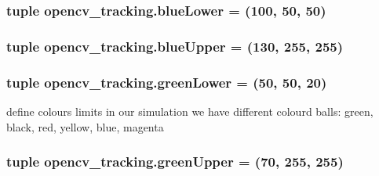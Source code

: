 \subsubsection[{\texorpdfstring{blue\+Lower}{blueLower}}]{\setlength{\rightskip}{0pt plus 5cm}tuple opencv\+\_\+tracking.\+blue\+Lower = (100, 50, 50)}\hypertarget{namespaceopencv__tracking_a16ee8fd0722f3e51be2902412cd3a648}{}\label{namespaceopencv__tracking_a16ee8fd0722f3e51be2902412cd3a648}
\subsubsection[{\texorpdfstring{blue\+Upper}{blueUpper}}]{\setlength{\rightskip}{0pt plus 5cm}tuple opencv\+\_\+tracking.\+blue\+Upper = (130, 255, 255)}\hypertarget{namespaceopencv__tracking_af6a8c3b7fb8173f13e8f7752d8b1aac1}{}\label{namespaceopencv__tracking_af6a8c3b7fb8173f13e8f7752d8b1aac1}
\subsubsection[{\texorpdfstring{green\+Lower}{greenLower}}]{\setlength{\rightskip}{0pt plus 5cm}tuple opencv\+\_\+tracking.\+green\+Lower = (50, 50, 20)}\hypertarget{namespaceopencv__tracking_ae20aa72a19e6e14042aba5f513e47666}{}\label{namespaceopencv__tracking_ae20aa72a19e6e14042aba5f513e47666}


define colours limits in our simulation we have different colourd balls\+: green, black, red, yellow, blue, magenta 

\subsubsection[{\texorpdfstring{green\+Upper}{greenUpper}}]{\setlength{\rightskip}{0pt plus 5cm}tuple opencv\+\_\+tracking.\+green\+Upper = (70, 255, 255)}\hypertarget{namespaceopencv__tracking_a1532ff08278ac73ec997a3fe7e722ae2}{}\label{namespaceopencv__tracking_a1532ff08278ac73ec997a3fe7e722ae2}
